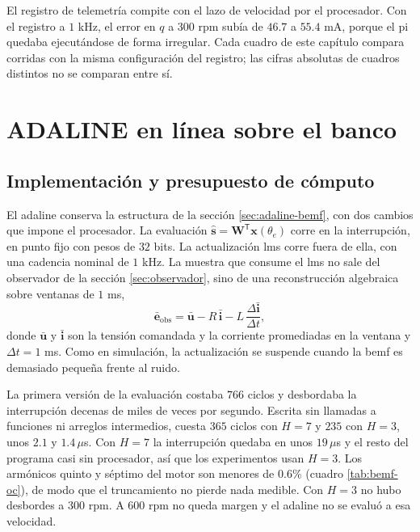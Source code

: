 \documentclass[../../../Tesis_JALS_Maestria.tex]{subfiles}
\begin{document}
El registro de telemetría compite con el lazo de velocidad por el procesador. Con el registro a $1$ kHz, el error en $q$ a $300$ rpm subía de $46.7$ a $55.4$ mA, porque el \acrshort{pi} quedaba ejecutándose de forma irregular. Cada cuadro de este capítulo compara corridas con la misma configuración del registro; las cifras absolutas de cuadros distintos no se comparan entre sí.

\section{ADALINE en línea sobre el banco}
\label{sec:adaline-banco}

\subsection{Implementación y presupuesto de cómputo}
\label{ssec:presupuesto}

El \acrshort{adaline} conserva la estructura de la sección \ref{sec:adaline-bemf}, con dos cambios que impone el procesador. La evaluación $\hat{\mathbf{s}} = \mathbf{W}^{\mathsf{T}}\mathbf{x}(\theta_e)$ corre en la interrupción, en punto fijo con pesos de $32$ bits. La actualización \acrshort{lms} corre fuera de ella, con una cadencia nominal de $1$ kHz. La muestra que consume el \acrshort{lms} no sale del observador de la sección \ref{sec:observador}, sino de una reconstrucción algebraica sobre ventanas de $1$ ms,
\begin{equation}
    \bar{\mathbf{e}}_\mathrm{obs} = \bar{\mathbf{u}} - R\,\bar{\mathbf{i}} - L\,\frac{\Delta\bar{\mathbf{i}}}{\Delta t},
    \label{eq:e-obs-banco}
\end{equation}
donde $\bar{\mathbf{u}}$ y $\bar{\mathbf{i}}$ son la tensión comandada y la corriente promediadas en la ventana y $\Delta t = 1$ ms. Como en simulación, la actualización se suspende cuando la \acrshort{bemf} es demasiado pequeña frente al ruido.

La primera versión de la evaluación costaba $766$ ciclos y desbordaba la interrupción decenas de miles de veces por segundo. Escrita sin llamadas a funciones ni arreglos intermedios, cuesta $365$ ciclos con $H = 7$ y $235$ con $H = 3$, unos $2.1$ y $1.4\,\mu$s. Con $H = 7$ la interrupción quedaba en unos $19\,\mu$s y el resto del programa casi sin procesador, así que los experimentos usan $H = 3$. Los armónicos quinto y séptimo del motor son menores de $0.6\%$ (cuadro \ref{tab:bemf-oc}), de modo que el truncamiento no pierde nada medible. Con $H = 3$ no hubo desbordes a $300$ rpm. A $600$ rpm no queda margen y el \acrshort{adaline} no se evaluó a esa velocidad.
\end{document}

